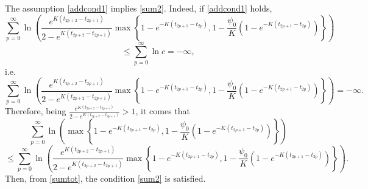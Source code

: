 \documentclass[a4paper,11pt,oneside]{article}
\begin{document}
\begin{oss}
	The assumption \eqref{addcond1} implies  \eqref{sum2}. Indeed, if \eqref{addcond1} holds, 
	$$\sum_{p=0}^{\infty}\ln \left(\frac{e^{K(t_{2p+2}-t_{2p+1})}}{2-e^{K(t_{2p+2}-t_{2p+1})}}\max\left\{1-e^{-K(t_{2p+1}-t_{2p})},1-\frac{\psi_{0}}{K}(1-e^{-K(t_{2p+1}-t_{2p})})\right\}\right)$$$$\leq \sum_{p=0}^{\infty}\ln c=-\infty,$$
	i.e. \begin{equation}\label{sumtot}
		\sum_{p=0}^{\infty}\ln \left(\frac{e^{K(t_{2p+2}-t_{2p+1})}}{2-e^{K(t_{2p+2}-t_{2p+1})}}\max\left\{1-e^{-K(t_{2p+1}-t_{2p})},1-\frac{\psi_{0}}{K}(1-e^{-K(t_{2p+1}-t_{2p})})\right\}\right)=-\infty.
	\end{equation}
	Therefore, being $\frac{e^{K(t_{2p+2}-t_{2p+1})}}{2-e^{K(t_{2p+2}-t_{2p+1})}}>1$, it comes that
		$$\sum_{p=0}^{\infty}\ln \left(\max\left\{1-e^{-K(t_{2p+1}-t_{2p})},1-\frac{\psi_{0}}{K}(1-e^{-K(t_{2p+1}-t_{2p})})\right\}\right)$$$$\leq\sum_{p=0}^{\infty}\ln \left(\frac{e^{K(t_{2p+2}-t_{2p+1})}}{2-e^{K(t_{2p+2}-t_{2p+1})}}\max\left\{1-e^{-K(t_{2p+1}-t_{2p})},1-\frac{\psi_{0}}{K}(1-e^{-K(t_{2p+1}-t_{2p})})\right\}\right).$$
		Then, from \eqref{sumtot}, the condition \eqref{sum2} is satisfied. 
	\end{oss}
\end{document}
